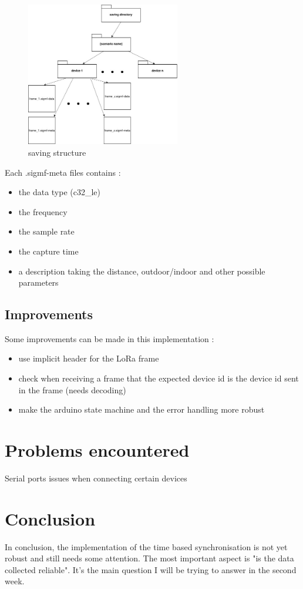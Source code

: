 \documentclass[a4paper, 12pt]{article}
\begin{document}
\begin{figure}[H]
  \begin{center}
    \includegraphics[width=0.6\textwidth]{images/save.jpg}
  \end{center}
  \caption{saving structure}\label{savestruct}
\end{figure}

Each .sigmf-meta files contains :
\begin{itemize}
  \item the data type (c32\_le)
  \item the frequency
  \item the sample rate
  \item the capture time
  \item a description taking the distance, outdoor/indoor and other possible parameters
\end{itemize}

\subsection{Improvements}
Some improvements can be made in this implementation :
\begin{itemize}
  \item use implicit header for the LoRa frame
  \item check when receiving a frame that the expected device id is the device id sent in the frame (needs decoding)
  \item make the arduino state machine and the error handling more robust  
\end{itemize}

\section{Problems encountered} 
Serial ports issues when connecting certain devices

\section{Conclusion}
In conclusion, the implementation of the time based synchronisation is not yet robust and still needs some attention.
The most important aspect is "is the data collected reliable". It's the main question I will be trying to answer in the second week.

\printbibliography
\end{document}
